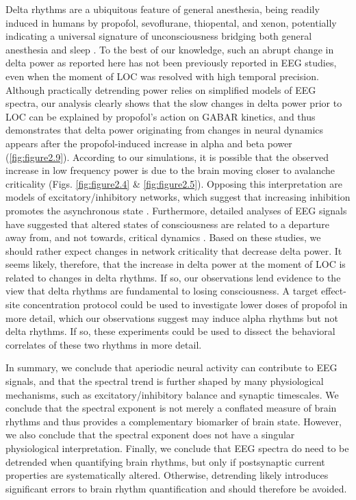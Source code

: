 Delta rhythms are a ubiquitous feature of general anesthesia, being readily induced in humans by propofol, sevoflurane, thiopental, and xenon\cite{Purdon2013, Gugino2001, Huupponen2008, Johnson2003, Lewis2012, Ma2006, Murphy2011}, potentially indicating a universal signature of unconsciousness bridging both general anesthesia and sleep \cite{Amzica1998, LeMasson2002, Steriade2000}. To the best of our knowledge, such an abrupt change in delta power as reported here has not been previously reported in EEG studies, even when the moment of LOC was resolved with high temporal precision\cite{Purdon2013}. Although practically detrending power relies on simplified models of EEG spectra, our analysis clearly shows that the slow changes in delta power prior to LOC can be explained by propofol’s action on GABAR kinetics, and thus demonstrates that delta power originating from changes in neural dynamics appears after the propofol-induced increase in alpha and beta power (\autoref{fig:figure2.9}). According to our simulations, it is possible that the observed increase in low frequency power is due to the brain moving closer to avalanche criticality (Figs. \ref{fig:figure2.4} \& \ref{fig:figure2.5}). Opposing this interpretation are models of excitatory/inhibitory networks, which suggest that increasing inhibition promotes the asynchronous state \cite{Li2020}. Furthermore, detailed analyses of EEG signals have suggested that altered states of consciousness are related to a departure away from, and not towards, critical dynamics \cite{Tagliazucchi2016, Toker2022}. Based on these studies, we should rather expect changes in network criticality that decrease delta power. It seems likely, therefore, that the increase in delta power at the moment of LOC is related to changes in delta rhythms. If so, our observations lend evidence to the view that delta rhythms are fundamental to losing consciousness. A target effect-site concentration protocol could be used to investigate lower doses of propofol in more detail, which our observations suggest may induce alpha rhythms but not delta rhythms. If so, these experiments could be used to dissect the behavioral correlates of these two rhythms in more detail.

In summary, we conclude that aperiodic neural activity can contribute to EEG signals, and that the spectral trend is further shaped by many physiological mechanisms, such as excitatory/inhibitory balance and synaptic timescales. We conclude that the spectral exponent is not merely a conflated measure of brain rhythms and thus provides a complementary biomarker of brain state. However, we also conclude that the spectral exponent does not have a singular physiological interpretation. Finally, we conclude that EEG spectra do need to be detrended when quantifying brain rhythms, but only if postsynaptic current properties are systematically altered. Otherwise, detrending likely introduces significant errors to brain rhythm quantification and should therefore be avoided.

